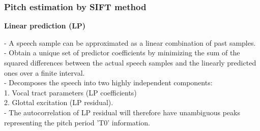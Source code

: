 \documentclass{beamer}
\begin{document}
\begin{frame}
\frametitle{Pitch estimation by SIFT method}

\textbf{Linear prediction (LP)\\}

- A speech sample can be approximated as a linear combination of past samples. \\
- Obtain a unique set of predictor coefficients by minimizing the sum of the squared differences between the actual speech samples and the linearly predicted ones over a finite interval.\\
- Decomposes the speech into two highly independent components:\\
\hspace{10mm} 1. Vocal tract parameters (LP coefficients)\\
\hspace{10mm} 2. Glottal excitation (LP residual).\\
- The autocorrelation of LP residual will therefore have unambiguous peaks representing the pitch period 'T0' information.
\end{frame}

\end{document}
